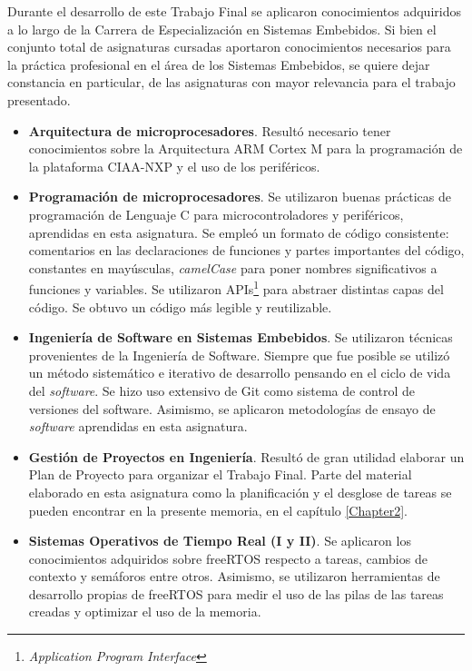 \medskip

Durante el desarrollo de este Trabajo Final se aplicaron conocimientos adquiridos a lo largo de la Carrera de Especialización en Sistemas Embebidos. Si bien el conjunto total de asignaturas cursadas aportaron conocimientos necesarios para la práctica profesional en el área de los Sistemas Embebidos, se quiere dejar constancia en particular, de las asignaturas con mayor relevancia para el trabajo presentado.

\begin{itemize}
\item
\textbf{Arquitectura de microprocesadores}. Resultó necesario tener conocimientos sobre la Arquitectura ARM Cortex M para la programación de la plataforma CIAA-NXP y el uso de los periféricos.

\item
\textbf{Programación de microprocesadores}. Se utilizaron buenas prácticas de programación de Lenguaje C para microcontroladores y periféricos, aprendidas en esta asignatura. Se empleó un formato de código consistente: comentarios en las declaraciones de funciones y partes importantes del código, constantes en mayúsculas, \textit{camelCase} para poner nombres significativos a funciones y variables. Se utilizaron APIs\footnote{\textit{Application Program Interface}} para abstraer distintas capas del código. Se obtuvo un código más legible y reutilizable.

\item
\textbf{Ingeniería de Software en Sistemas Embebidos}. Se utilizaron técnicas provenientes de la Ingeniería de Software. Siempre que fue posible se utilizó un método sistemático e iterativo de desarrollo pensando en el ciclo de vida del \textit{software}. Se hizo uso extensivo de Git como sistema de control de versiones del software.  Asimismo, se aplicaron metodologías de ensayo de \textit{software} aprendidas en esta asignatura.

\item
\textbf{Gestión de Proyectos en Ingeniería}. Resultó de gran utilidad elaborar un Plan de Proyecto para organizar el Trabajo Final.  Parte del material elaborado en esta asignatura como la planificación y el desglose de tareas se pueden encontrar en la presente memoria, en el capítulo \ref{Chapter2}.

\item
\textbf{Sistemas Operativos de Tiempo Real (I y II)}. Se aplicaron los conocimientos adquiridos sobre freeRTOS respecto a tareas, cambios de contexto y semáforos entre otros.  Asimismo, se utilizaron herramientas de desarrollo propias de freeRTOS para medir el uso de las pilas de las tareas creadas y optimizar el uso de la memoria.


\end{itemize}
